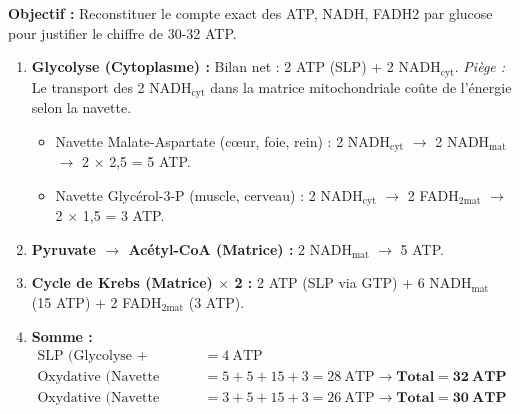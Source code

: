 \documentclass[11pt]{article}
\begin{document}
\begin{methode}
    \textbf{Objectif :} Reconstituer le compte exact des ATP, NADH, FADH2 par glucose pour justifier le chiffre de 30-32 ATP.
    \begin{enumerate}
        \item \textbf{Glycolyse (Cytoplasme) :} Bilan net : 2 ATP (SLP) + 2 NADH$_{\text{cyt}}$.
              \emph{Piège :} Le transport des 2 NADH$_{\text{cyt}}$ dans la matrice mitochondriale coûte de l'énergie selon la navette.
              \begin{itemize}
                  \item Navette Malate-Aspartate (cœur, foie, rein) : 2 NADH$_{\text{cyt}}$ $\to$ 2 NADH$_{\text{mat}}$ $\to$ 2 $\times$ 2,5 = 5 ATP.
                  \item Navette Glycérol-3-P (muscle, cerveau) : 2 NADH$_{\text{cyt}}$ $\to$ 2 FADH$_{2\text{mat}}$ $\to$ 2 $\times$ 1,5 = 3 ATP.
              \end{itemize}
        \item \textbf{Pyruvate $\to$ Acétyl-CoA (Matrice) :} 2 NADH$_{\text{mat}}$ $\to$ 5 ATP.
        \item \textbf{Cycle de Krebs (Matrice) $\times$ 2 :} 2 ATP (SLP via GTP) + 6 NADH$_{\text{mat}}$ (15 ATP) + 2 FADH$_{2\text{mat}}$ (3 ATP).
        \item \textbf{Somme :}
              \begin{align*}
                  \text{SLP (Glycolyse + Krebs)} &= 4\ \text{ATP} \\
                  \text{Oxydative (Navette Malate-Aspartate)} &= 5 + 5 + 15 + 3 = 28\ \text{ATP} \to \mathbf{Total = 32\ ATP} \\
                  \text{Oxydative (Navette Glycérol-3-P)} &= 3 + 5 + 15 + 3 = 26\ \text{ATP} \to \mathbf{Total = 30\ ATP}
              \end{align*}
    \end{enumerate}
\end{methode}
\end{document}
